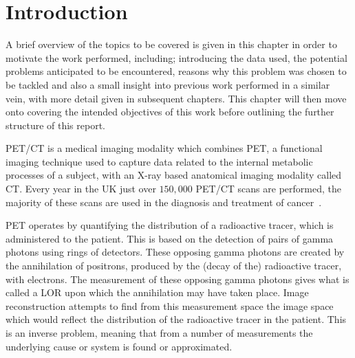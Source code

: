 \chapter{Introduction} \label{sec:introduction}
    \newpage
    
        A brief overview of the topics to be covered is given in this chapter in order to motivate the work performed, including; introducing the data used, the potential problems anticipated to be encountered, reasons why this problem was chosen to be tackled and also a small insight into previous work performed in a similar vein, with more detail given in subsequent chapters. This chapter will then move onto covering the intended objectives of this work before outlining the further structure of this report.
    
        \gls{PET}/\gls{CT} is a medical imaging modality which combines \gls{PET}, a functional imaging technique used to capture data related to the internal metabolic processes of a subject, with an X-ray based anatomical imaging modality called \gls{CT}. Every year in the UK just over $150,000$ \gls{PET}/\gls{CT} scans are performed, the majority of these scans are used in the diagnosis and treatment of cancer~.
    
        \gls{PET} operates by quantifying the distribution of a radioactive tracer, which is administered to the patient. This is based on the detection of pairs of gamma photons using rings of detectors. These opposing gamma photons are created by the annihilation of positrons, produced by the (decay of the) radioactive tracer, with electrons. The measurement of these opposing gamma photons gives what is called a \gls{LOR} upon which the annihilation may have taken place. Image reconstruction attempts to find from this measurement space the image space which would reflect the distribution of the radioactive tracer in the patient. This is an inverse problem, meaning that from a number of measurements the underlying cause or system is found or approximated.
            
